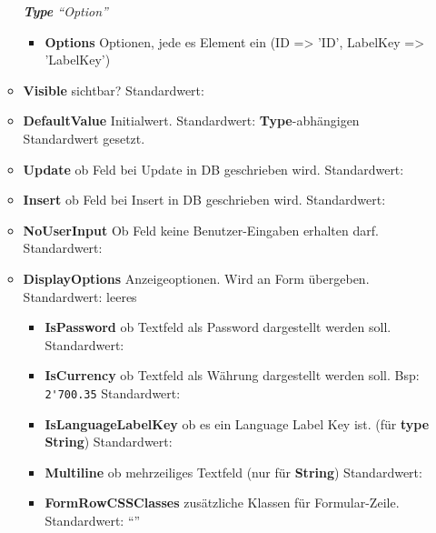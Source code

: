 \begin{itemize}
\begin{itemize}
                             \-\hspace{2mm}\textit{\textbf{Type} ``Option''}
                             \begin{itemize}
                                 \item \textbf{Options}  Optionen, jede es Element ein  (ID => 'ID', LabelKey => 'LabelKey')
                             \end{itemize}
                        \item \textbf{Visible}\superscript{*}  sichtbar? Standardwert: 
                        \item \textbf{DefaultValue}\superscript{*}  Initialwert. Standardwert: \textbf{Type}-abhängigen Standardwert gesetzt.
                        \item \textbf{Update}\superscript{*}  ob Feld bei Update in DB geschrieben wird. Standardwert: 
                        \item \textbf{Insert}\superscript{*}  ob Feld bei Insert in DB geschrieben wird. Standardwert: 
                        \item \textbf{NoUserInput}\superscript{*}  Ob Feld keine Benutzer-Eingaben erhalten darf. Standardwert: 
                        \item \textbf{DisplayOptions}\superscript{*}
                            Anzeigeoptionen. Wird an Form übergeben. Standardwert: leeres 
                            \begin{itemize}
                                \item \textbf{IsPassword}\superscript{*}  ob Textfeld als Password dargestellt werden soll. Standardwert: 
                                \item \textbf{IsCurrency}\superscript{*}  ob Textfeld als Währung dargestellt werden soll. Bsp: \verb+2'700.35+ Standardwert: 
                                \item \textbf{IsLanguageLabelKey}\superscript{*}  ob es ein Language Label Key ist. (für \textbf{type} \textbf{String}) Standardwert: 
                                \item \textbf{Multiline}\superscript{*}  ob mehrzeiliges Textfeld (nur für \textbf{String}) Standardwert: 
                                \item \textbf{FormRowCSSClasses}\superscript{*}  zusätzliche Klassen für Formular-Zeile. Standardwert: ``''

\end{itemize}
\end{itemize}
\end{itemize}
